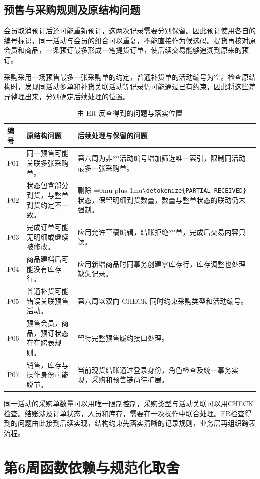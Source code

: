 \documentclass{SYSUReport}
\newcommand{\code}[1]{\begingroup\Urlmuskip=0mu plus 1mu\expandafter\nolinkurl\expandafter{\detokenize{#1}}\endgroup}
\begin{document}
\medskip
\Needspace{0.72\textheight}
\subsection{预售与采购规则及原结构问题}
会员取消预订后还可能重新预订，这两次记录需要分别保留。因此预订使用各自的编号标识，同一活动与会员的组合可以重复，不能直接作为候选码。提货再核对原会员和商品，一条预订最多形成一笔提货订单，使后续交易能够追溯到原来的预订。

采购采用一场预售最多一张采购单的约定，普通补货单的活动编号为空。检查原结构时，发现同活动多单和补货关联活动等记录仍可能通过已有约束，因此将这些差异整理出来，分别确定后续处理的位置。

\begin{table}[H]\centering\small
\begin{tabularx}{\textwidth}{P{1.0cm}P{4.0cm}Y}
\toprule 编号 & 原结构问题 & 后续处理与保留的问题 \\
\midrule
P01 & 同一预售可能关联多张采购单。 & 第六周为非空活动编号增加筛选唯一索引，限制同活动最多一张采购单。 \\
P02 & 状态包含部分到货，与整单到货约定不一致。 & 删除 \code{PARTIAL_RECEIVED} 状态，保留明细到货数量，数量与整单状态的联动仍未强制。 \\
P03 & 完成订单可能无明细或继续被修改。 & 应用允许草稿编辑，结账拒绝空单，完成后交易内容只读。 \\
P04 & 商品建档后可能没有库存行。 & 应用新增商品时同事务创建零库存行，库存调整也处理缺失记录。 \\
P05 & 普通补货可能错误关联预售活动。 & 第六周以双向 CHECK 同时约束采购类型和活动编号。 \\
P06 & 预售会员，商品，预订状态存在跨表规则。 & 留待完整预售履约接口处理。 \\
P07 & 销售，库存与操作身份可能脱节。 & 当前现货结账通过登录身份，角色检查及统一事务实现，采购和预售链尚待扩展。 \\
\bottomrule
\end{tabularx}\caption{由 ER 反查得到的问题与落实位置}
\end{table}

同一活动的采购单数量可以用唯一限制控制，采购类型与活动关联可以用CHECK检查。结账涉及订单状态，人员和库存，需要在一次操作中联合处理。ER检查得到的问题由此接到后续实现，结构约束先落实清晰的记录规则，业务层再组织跨表流程。

\clearpage
\section{第6周函数依赖与规范化取舍}
\Needspace{0.72\textheight}
\end{document}
